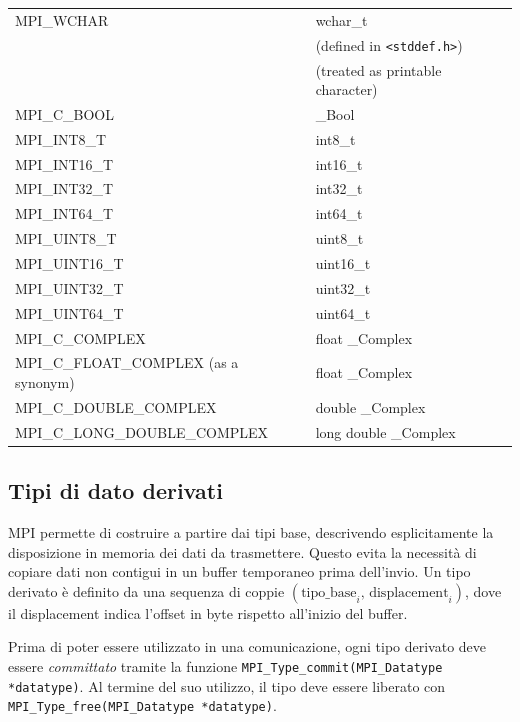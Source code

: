 \begin{longtable}{p{}p{}}
MPI\_WCHAR                             & wchar\_t \\
                                       & (defined in \texttt{<stddef.h>}) \\
                                       & (treated as printable character) \\[4pt]
MPI\_C\_BOOL                           & \_Bool \\
MPI\_INT8\_T                           & int8\_t \\
MPI\_INT16\_T                          & int16\_t \\
MPI\_INT32\_T                          & int32\_t \\
MPI\_INT64\_T                          & int64\_t \\
MPI\_UINT8\_T                          & uint8\_t \\
MPI\_UINT16\_T                         & uint16\_t \\
MPI\_UINT32\_T                         & uint32\_t \\
MPI\_UINT64\_T                         & uint64\_t \\
MPI\_C\_COMPLEX                        & float \_Complex \\
MPI\_C\_FLOAT\_COMPLEX (as a synonym)  & float \_Complex \\
MPI\_C\_DOUBLE\_COMPLEX                & double \_Complex \\
MPI\_C\_LONG\_DOUBLE\_COMPLEX          & long double \_Complex \\
\end{longtable}

\subsection{Tipi di dato derivati}
MPI permette di costruire  a partire dai tipi base, descrivendo esplicitamente la disposizione in memoria dei dati da trasmettere. Questo evita la necessità di copiare dati non contigui in un buffer temporaneo prima dell'invio. Un tipo derivato è definito da una sequenza di coppie \((\text{tipo\_base}_i,\, \text{displacement}_i)\), dove il displacement indica l'offset in byte rispetto all'inizio del buffer.

Prima di poter essere utilizzato in una comunicazione, ogni tipo derivato deve essere \emph{committato} tramite la funzione \texttt{MPI\_Type\_commit(MPI\_Datatype *datatype)}.
Al termine del suo utilizzo, il tipo deve essere liberato con \texttt{MPI\_Type\_free(MPI\_Datatype *datatype)}.


